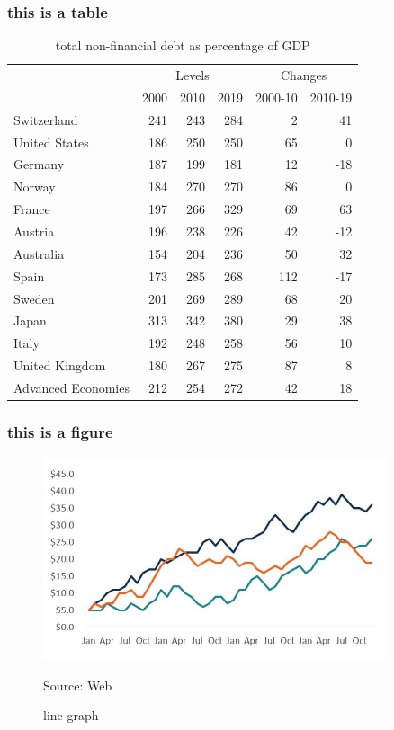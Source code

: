 \documentclass[10pt]{beamer}
\begin{document}
\begin{frame}
\frametitle {this is a table}
\begin{table}
	\centering
	\caption{total non-financial debt as percentage of GDP}
	\begin{tabular}{l|rrr|rr}
		\midrule
		\multicolumn{1}{r}{} & \multicolumn{3}{c|}{Levels} & \multicolumn{2}{c}{Changes} \\
		\cmidrule{2-6}    \multicolumn{1}{r}{} & \multicolumn{1}{c}{2000} & \multicolumn{1}{c}{2010} & \multicolumn{1}{c|}{2019} & \multicolumn{1}{c}{2000-10} & \multicolumn{1}{c}{2010-19} \\
		\midrule
		Switzerland & 241   & 243   & 284   & 2     & 41 \\
		United States & 186   & 250   & 250   & 65    & 0 \\
		Germany & 187   & 199   & 181   & 12    & -18 \\
		Norway & 184   & 270   & 270   & 86    & 0 \\
		France & 197   & 266   & 329   & 69    & 63 \\
		Austria & 196   & 238   & 226   & 42    & -12 \\
		Australia & 154   & 204   & 236   & 50    & 32 \\
		Spain & 173   & 285   & 268   & 112   & -17 \\
		Sweden & 201   & 269   & 289   & 68    & 20 \\
		Japan & 313   & 342   & 380   & 29    & 38 \\
		Italy & 192   & 248   & 258   & 56    & 10 \\
		United Kingdom & 180   & 267   & 275   & 87    & 8 \\
		\midrule
		Advanced Economies\footnotemark[2] & 212   & 254   & 272   & 42    & 18 \\
			\end{tabular}%
	\label{tab:total non financial debt as percentage of GDP}%
\end{table}%

\end{frame}



\begin{frame}
\frametitle{this is a figure}

\begin{figure}[h]
	\centering
	\includegraphics[width=0.9\textwidth]{line-graph.jpg}
	\caption{line graph}
	{Source: Web}
	\label{fig:basicgrowthreg}
\end{figure}

\end{frame}
\end{document}
